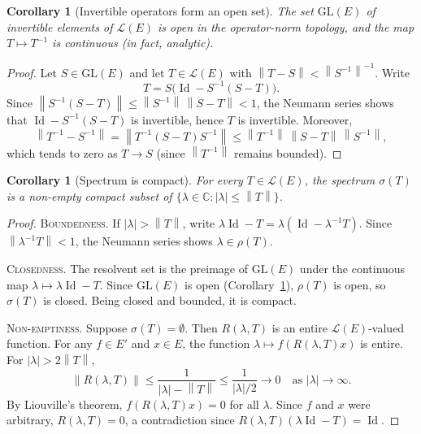 \documentclass[a4paper,12pt]{book}
\DeclareMathOperator{\Id}{Id}
\newcommand{\C}{\mathbb{C}}
\newcommand{\norm}[1]{\left\| #1 \right\|}
\newcommand{\abs}[1]{\left| #1 \right|}
\theoremstyle{definition}
\theoremstyle{plain}
\newtheorem{corollary}[definition]{Corollary}
\theoremstyle{remark}
\begin{document}
\begin{corollary}[Invertible operators form an open set]
\label{cor:inv-open}
The set $\mathrm{GL}(E)$ of invertible elements of $\mathcal{L}(E)$ is open in
the operator-norm topology, and the map $T\mapsto T^{-1}$ is continuous (in fact,
analytic).
\end{corollary}

\begin{proof}
Let $S\in\mathrm{GL}(E)$ and let $T\in\mathcal{L}(E)$ with
$\norm{T-S}<\norm{S^{-1}}^{-1}$. Write
\[
  T = S\bigl(\Id - S^{-1}(S-T)\bigr).
\]
Since $\norm{S^{-1}(S-T)}\leq\norm{S^{-1}}\,\norm{S-T}<1$, the Neumann series
shows that $\Id - S^{-1}(S-T)$ is invertible, hence $T$ is invertible. Moreover,
\[
  \norm{T^{-1}-S^{-1}}
  = \norm{T^{-1}(S-T)S^{-1}}
  \leq \norm{T^{-1}}\,\norm{S-T}\,\norm{S^{-1}},
\]
which tends to zero as $T\to S$ (since $\norm{T^{-1}}$ remains bounded).
\end{proof}

\begin{corollary}[Spectrum is compact]\label{cor:spectrum-compact}
For every $T\in\mathcal{L}(E)$, the spectrum $\sigma(T)$ is a non-empty compact
subset of $\{\lambda\in\C : \abs{\lambda}\leq\norm{T}\}$.
\end{corollary}

\begin{proof}
\textsc{Boundedness.} If $\abs{\lambda}>\norm{T}$, write
$\lambda\Id - T = \lambda(\Id - \lambda^{-1}T)$. Since
$\norm{\lambda^{-1}T}<1$, the Neumann series shows $\lambda\in\rho(T)$.

\textsc{Closedness.} The resolvent set is the preimage of $\mathrm{GL}(E)$ under
the continuous map $\lambda\mapsto\lambda\Id - T$. Since $\mathrm{GL}(E)$ is
open (Corollary~\ref{cor:inv-open}), $\rho(T)$ is open, so $\sigma(T)$ is
closed. Being closed and bounded, it is compact.

\textsc{Non-emptiness.} Suppose $\sigma(T)=\emptyset$.
Then $R(\lambda,T)$ is an entire $\mathcal{L}(E)$-valued function. For any
$f\in E'$ and $x\in E$, the function $\lambda\mapsto f(R(\lambda,T)x)$ is
entire. For $\abs{\lambda}>2\norm{T}$,
\[
  \norm{R(\lambda,T)} \leq \frac{1}{\abs{\lambda}-\norm{T}}
  \leq \frac{1}{\abs{\lambda}/2} \to 0 \quad\text{as }\abs{\lambda}\to\infty.
\]
By Liouville's theorem, $f(R(\lambda,T)x)=0$ for all
$\lambda$. Since $f$ and $x$ were arbitrary, $R(\lambda,T)=0$, a contradiction
since $R(\lambda,T)(\lambda\Id-T)=\Id$.
\end{proof}
\end{document}
